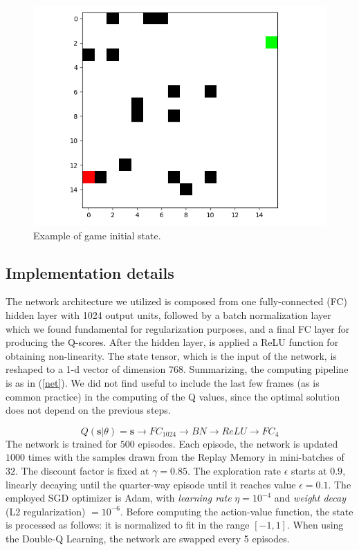 \documentclass{article}
\begin{document}
\begin{figure}
	\centering
	\includegraphics[width=\textwidth]{game_example}
	\caption{Example of game initial state.}
	\label{fig:game1}
\end{figure}

\subsection{Implementation details}
The network architecture we utilized is composed from one fully-connected (FC) hidden layer with 1024 output units, followed by a batch normalization layer which we found fundamental for regularization purposes, and a final FC layer for producing the Q-scores. After the hidden layer, is applied a ReLU function for obtaining non-linearity. The state tensor, which is the input of the network, is reshaped to a 1-d vector of dimension $768$. Summarizing, the computing pipeline is as in (\ref{net}). We did not find useful to include the last few frames (as is common practice) in the computing of the Q values, since the optimal solution does not depend on the previous steps. %

\begin{equation}
\label{net}
	Q(\textbf{s}|\theta) = \textbf{s} \rightarrow FC_{1024} \rightarrow BN \rightarrow ReLU \rightarrow FC_{4}
\end{equation}
The network is trained for $500$ episodes. Each episode, the network is updated $1000$ times with the samples drawn from the Replay Memory in mini-batches of $32$. The discount factor is fixed at $\gamma=0.85$. The exploration rate $\epsilon$ starts at $0.9$, linearly decaying until the quarter-way episode until it reaches value $\epsilon = 0.1$. The employed SGD optimizer is Adam, with \textit{learning rate} $\eta = 10^{-4}$ and \textit{weight decay} (L2 regularization) $= 10^{-6}$.
Before computing the action-value function, the state is processed as follows: it is normalized to fit in the range $[-1,1]$. When using the Double-Q Learning, the network are swapped every 5 episodes.
\end{document}
